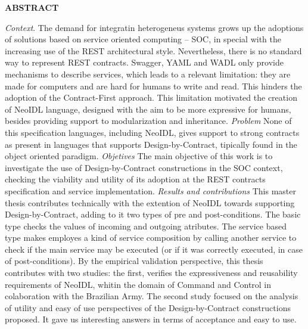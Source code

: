 \noindent
{\large {\bf ABSTRACT}}

\vspace{5mm}
 
\vspace{5mm} 





\emph{Context}. The demand for integratin heterogeneus systems grows up the
adoptions of solutions based on service oriented computing -- SOC, in special
with the increasing use of the REST architectural style. Nevertheless, there
is no standard way to represent REST contracts.
Swagger, YAML and WADL only provide mechanisms to describe services, which
leads to a relevant limitation: they are made for computers and
are hard for humans to write and read. This hinders the adoption of the 
Contract-First approach. This limitation motivated the creation of NeoIDL
language, designed with the aim to be more expressive for humans, besides
providing support to modularization and inheritance. \emph{Problem} None of this
specification languages, including NeoIDL, gives support to strong contracts
as present in languages that supports Design-by-Contract, tipically found in
the  object oriented paradigm. \emph{Objetives} The main objective of this work
is  to investigate the use of Design-by-Contract constructions in the SOC context, 
checking the viability and utility of its adoption at the REST contracts specification
and service implementation. \emph{Results and contributions} This
master thesis contributes technically with the extention of NeoIDL towards
supporting Design-by-Contract, adding to it two types of pre and
post-conditions.
The basic type checks the values of incoming and outgoing atributes. The
service based type makes employes a kind of service composition by
calling another service to check if the main service may be executed (or if it was correctly executed, in case of
post-conditions). By the empirical validation perspective, this thesis
contributes with two studies: the first, verifies the expressiveness and
reusability requirements of NeoIDL, whitin the domain of Command
and Control in colaboration with the Brazilian Army. The second
study focused on the analysis of utility and easy of use perspectives of the 
Design-by-Contract constructions proposed. It gave us interesting answers in
terms of acceptance and easy to use.

\clearpage
